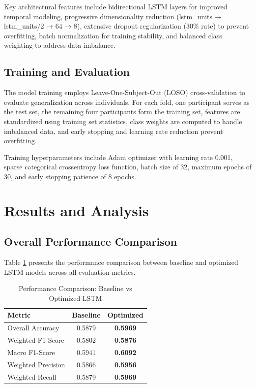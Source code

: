 \documentclass{iopconfser}
\begin{document}
Key architectural features include bidirectional LSTM layers for improved temporal modeling, progressive dimensionality reduction (lstm\_units → lstm\_units/2 → 64 → 8), extensive dropout regularization (30\% rate) to prevent overfitting, batch normalization for training stability, and balanced class weighting to address data imbalance.

\subsection{Training and Evaluation}

The model training employs Leave-One-Subject-Out (LOSO) cross-validation to evaluate generalization across individuals. For each fold, one participant serves as the test set, the remaining four participants form the training set, features are standardized using training set statistics, class weights are computed to handle imbalanced data, and early stopping and learning rate reduction prevent overfitting.

Training hyperparameters include Adam optimizer with learning rate 0.001, sparse categorical crossentropy loss function, batch size of 32, maximum epochs of 30, and early stopping patience of 8 epochs.

\section{Results and Analysis}

\subsection{Overall Performance Comparison}

Table \ref{tab:performance_comparison} presents the performance comparison between baseline and optimized LSTM models across all evaluation metrics.

\begin{table}[H]
\centering
\caption{Performance Comparison: Baseline vs Optimized LSTM}
\label{tab:performance_comparison}
\begin{tabular}{lcc}
\toprule
\textbf{Metric} & \textbf{Baseline} & \textbf{Optimized} \\
\midrule
Overall Accuracy & 0.5879 & \textbf{0.5969} \\
Weighted F1-Score & 0.5802 & \textbf{0.5876} \\
Macro F1-Score & 0.5941 & \textbf{0.6092} \\
Weighted Precision & 0.5866 & \textbf{0.5956} \\
Weighted Recall & 0.5879 & \textbf{0.5969} \\
\bottomrule
\end{tabular}
\end{table}
\end{document}

